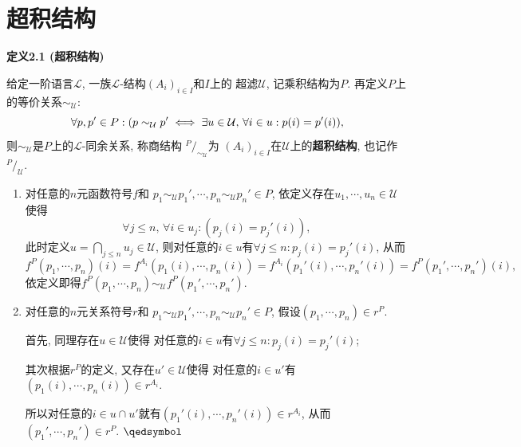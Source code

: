 \newpage

\section{超积结构}

\hypertarget{sec:定义2.1}{}
\noindent\textbf{定义2.1 (超积结构)}

给定一阶语言$\mathcal{L}$, 一族$\mathcal{L}$-结构$(A_i)_{i\in I}$和$I$上的
超滤$\mathcal{U}$, 记乘积结构为$P$. 再定义$P$上的等价关系$\sim_{\mathcal{U}}$:
\[
    \forall p,p'\in P:(p\sim_{\mathcal{U}}p'\iff
    \exists u\in\mathcal{U},\,\forall i\in u:p(i)=p'(i)),\\[3pt]
\]
则$\sim_{\mathcal{U}}$是$P$上的$\mathcal{L}$-同余关系, 称商结构
$^{\displaystyle P}\!/_{\displaystyle\sim_{\mathcal{U}}}$为
$(A_i)_{i\in I}$在$\mathcal{U}$上的\textbf{超积结构},
也记作$^{\displaystyle P}\!/_{\displaystyle\mathcal{U}}$.


\begin{enumerate}
    \item 对任意的$n$元函数符号$f$和
    $p_1\sim_{\mathcal{U}}p_1',\cdots,p_n\sim_{\mathcal{U}}p_n'\in P$,
    依定义存在$u_1,\cdots,u_n\in\mathcal{U}$使得
    \[
        \forall j\leqslant n,\,\forall i\in u_j:(p_j(i)=p_j'(i)),
    \]
    此时定义$\displaystyle u=\bigcap_{j\leqslant n}u_j\in\mathcal{U}$,
    则对任意的$i\in u$有$\forall j\leqslant n:p_j(i)=p_j'(i)$, 从而
    \vspace{3pt}
    \[
        f^P(p_1,\cdots,p_n)(i)=f^{A_i}(p_1(i),\cdots,p_n(i))
        =f^{A_i}(p_1'(i),\cdots,p_n'(i))=f^P(p_1',\cdots,p_n')(i),
    \]
    依定义即得$f^P(p_1,\cdots,p_n)\sim_{\mathcal{U}}f^P(p_1',\cdots,p_n')$.

    \item 对任意的$n$元关系符号$r$和
    $p_1\sim_{\mathcal{U}}p_1',\cdots,p_n\sim_{\mathcal{U}}p_n'\in P$,
    假设$(p_1,\cdots,p_n)\in r^P$.

    \hspace{2.17em}
    首先, 同理存在$u\in\mathcal{U}$使得
    对任意的$i\in u$有$\forall j\leqslant n:p_j(i)=p_j'(i)$;

    \hspace{2.17em}
    其次根据$r^P$的定义, 又存在$u'\in\mathcal{U}$使得
    对任意的$i\in u'$有$(p_1(i),\cdots,p_n(i))\in r^{A_i}$.

    \hspace{2.17em}
    所以对任意的$i\in u\cap u'$就有$(p_1'(i),\cdots,p_n'(i))\in r^{A_i}$,
    从而$(p_1',\cdots,p_n')\in r^P$. \hfill $\qedsymbol$
\end{enumerate}

